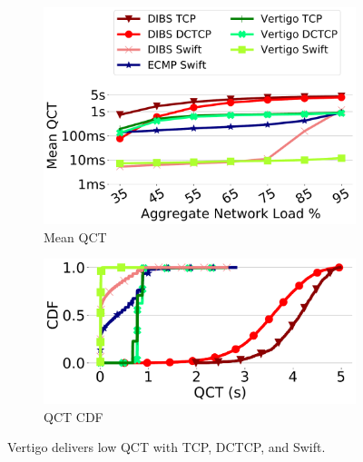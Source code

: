 \begin{figure}
    	\begin{subfigure}[t]{.45\linewidth}
	\centering
	\includegraphics[width=0.98\linewidth]{figs/qps25tcpdctcpswift.pdf}
		\caption{\small{Mean QCT}}
		\label{fig:transport_qct}
	\end{subfigure}
	\begin{subfigure}[t]{.45\linewidth}
	\centering
	\includegraphics[width=0.98\linewidth]{figs/qps25tcpdctcpcdf.pdf}
		\caption{\small{QCT CDF}}
		\label{fig:cdf}
	\end{subfigure}

    \caption{\small{ Vertigo delivers low QCT with TCP, DCTCP, and Swift. 
    }}
	\label{fig:tcp}
	\vspace{-3mm}
\end{figure}

